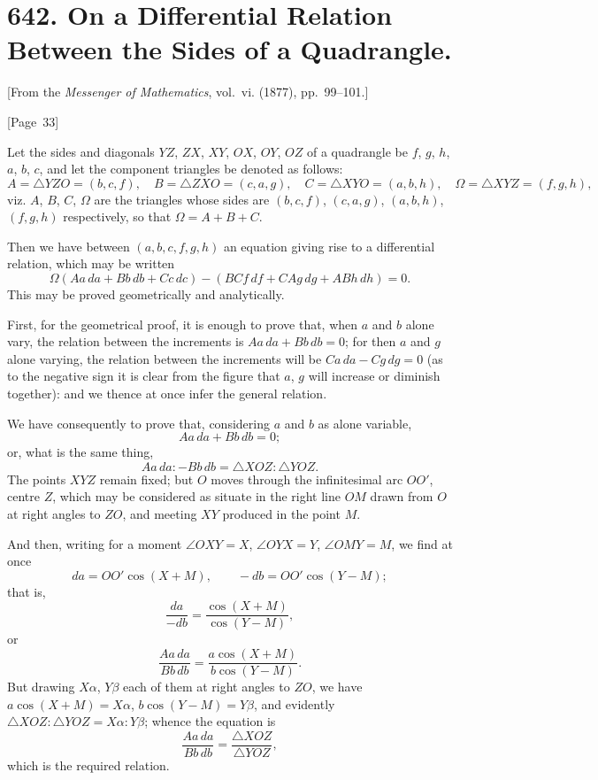 \documentclass[11pt,a4paper]{article}
\theoremstyle{plain}
\theoremstyle{definition}
\theoremstyle{remark}
\begin{document}
\section*{642. On a Differential Relation Between the Sides of a Quadrangle.}

[From the \textit{Messenger of Mathematics}, vol.~vi. (1877), pp.~99--101.]

\begin{center}
[Page~33]
\end{center}

Let the sides and diagonals $YZ$, $ZX$, $XY$, $OX$, $OY$, $OZ$ of a
quadrangle be $f$, $g$, $h$, $a$, $b$, $c$, and let the component triangles
be denoted as follows:
\[
A = \triangle YZO = (b,c,f), \quad
B = \triangle ZX O = (c,a,g), \quad
C = \triangle XY O = (a,b,h), \quad
\Omega = \triangle XYZ = (f,g,h),
\]
viz. $A$, $B$, $C$, $\Omega$ are the triangles whose sides are
$(b,c,f)$, $(c,a,g)$, $(a,b,h)$, $(f,g,h)$ respectively,
so that $\Omega = A + B + C$.

Then we have between $(a,b,c,f,g,h)$ an equation giving rise to a
differential relation, which may be written
\[
\Omega(Aa\,da + Bb\,db + Cc\,dc) - (BCf\,df + CAg\,dg + ABh\,dh) = 0.
\]
This may be proved geometrically and analytically.

First, for the geometrical proof, it is enough to prove that, when
$a$ and $b$ alone vary, the relation between the increments is
$Aa\,da + Bb\,db = 0$;
for then $a$ and $g$ alone varying, the relation between the increments
will be $Ca\,da - Cg\,dg = 0$
(as to the negative sign it is clear from the figure that $a$, $g$
will increase or diminish together):
and we thence at once infer the general relation.

We have consequently to prove that, considering $a$ and $b$ as alone
variable,
\[
Aa\,da + Bb\,db = 0;
\]
or, what is the same thing,
\[
Aa\,da : -Bb\,db = \triangle XOZ : \triangle YOZ.
\]
The points $XYZ$ remain fixed; but $O$ moves through the infinitesimal
arc $OO'$, centre $Z$, which may be considered as situate in the right
line $OM$ drawn from $O$ at right angles to $ZO$, and meeting $XY$
produced in the point $M$.

And then, writing for a moment $\angle OXY = X$, $\angle OYX = Y$,
$\angle OMY = M$, we find at once
\[
da = OO' \cos(X+M), \qquad -db = OO' \cos(Y-M);
\]
that is,
\[
\frac{da}{-db} = \frac{\cos(X+M)}{\cos(Y-M)},
\]
or
\[
\frac{Aa\,da}{Bb\,db} = \frac{a\cos(X+M)}{b\cos(Y-M)}.
\]
But drawing $X\alpha$, $Y\beta$ each of them at right angles to $ZO$, we
have $a\cos(X+M) = X\alpha$, $b\cos(Y-M) = Y\beta$, and evidently
$\triangle XOZ : \triangle YOZ = X\alpha : Y\beta$;
whence the equation is
\[
\frac{Aa\,da}{Bb\,db} = \frac{\triangle XOZ}{\triangle YOZ},
\]
which is the required relation.
\end{document}
